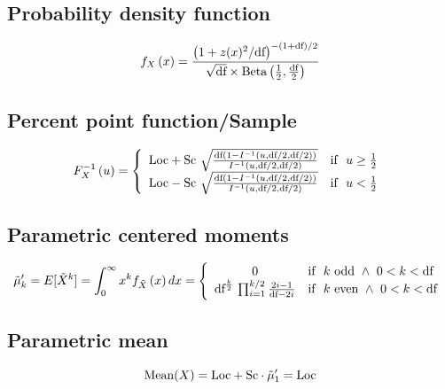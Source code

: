 \documentclass{article}
\begin{document}
\subsection{Probability density function}
\begin{equation*} f_{X}\left(x\right)=\frac{\left(1+z(x)^{2}/\text{df}\right)^{-(1+\text{df})/2}}{\sqrt{\text{df}}\times \text{Beta}\left(\frac{1}{2},\frac{\text{df}}{2}\right)}\\ \end{equation*}
\subsection{Percent point function/Sample}
\begin{equation*} F^{-1}_{X}\left(u\right)=\left\{\begin{array}{cl} \text{Loc}+\text{Sc} \ \sqrt{\frac{\text{df}(1-I^{-1}\left(u,\text{df}/2,\text{df}/2\right))}{I^{-1}\left(u,\text{df}/2,\text{df}/2\right)}} & \text{if } \ u \geq \frac{1}{2} \\ \text{Loc}-\text{Sc} \ \sqrt{\frac{\text{df}(1-I^{-1}\left(u,\text{df}/2,\text{df}/2\right))}{I^{-1}\left(u,\text{df}/2,\text{df}/2\right)}} & \text{if } \ u < \frac{1}{2} \end{array} \right.\\ \end{equation*}
\subsection{Parametric centered moments}
\begin{equation*} \tilde{\mu}'_{k}=E[\tilde{X}^k]=\int_{0}^{\infty}x^{k}f_{\tilde{X}}\left(x\right)dx=\left\{\begin{array}{cl} 0 & \text{if } \ k\text{ odd} \ \wedge \ 0 < k < \text{df} \\ \text{df}^{\frac{k}{2}} \,\prod_{i=1}^{k/2}\frac{2i-1}{\text{df}-2i} & \text{if } \ k\text{ even} \ \wedge \ 0 < k < \text{df} \end{array} \right.\\ \end{equation*}
\subsection{Parametric mean}
\begin{equation*} \mathrm{Mean}(X)=\text{Loc}+\text{Sc}\cdot\tilde{\mu}'_{1}=\text{Loc}\\ \end{equation*}
\end{document}
